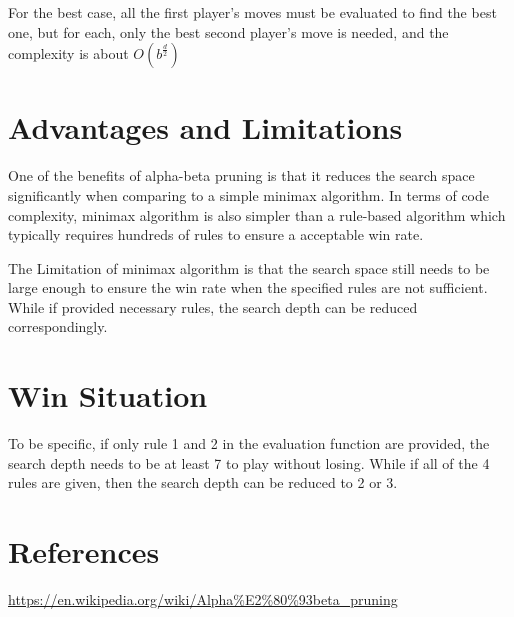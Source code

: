 \documentclass[titlepage]{article}
\begin{document}
For the best case, all the first player's moves must be evaluated to find the
best one, but for each, only the best second player's move is needed, and the
complexity is about \(O(b^{\frac{d}{2}})\)

\section{Advantages and Limitations}
\label{sec:org950dc3c}
One of the benefits of alpha-beta pruning is that it reduces the search space
significantly when comparing to a simple minimax algorithm. In terms of code
complexity, minimax algorithm is also simpler than a rule-based algorithm which
typically requires hundreds of rules to ensure a acceptable win rate.

The Limitation of minimax algorithm is that the search space still needs to be
large enough to ensure the win rate when the specified rules are not
sufficient. While if provided necessary rules, the search depth can be reduced
correspondingly.

\section{Win Situation}
\label{sec:org55e5a30}
To be specific, if only rule 1 and 2 in the evaluation function are provided,
the search depth needs to be at least 7 to play without losing. While if all
of the 4 rules are given, then the search depth can be reduced to 2 or 3.

\section{References}
\label{sec:org08c8d3e}
\url{https://en.wikipedia.org/wiki/Alpha\%E2\%80\%93beta\_pruning}

\newpage
\end{document}
